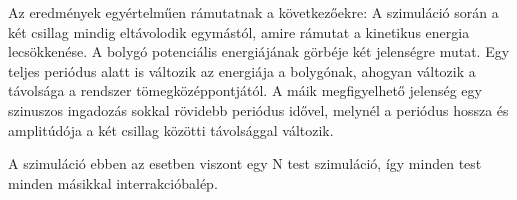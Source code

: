 Az eredmények egyértelműen rámutatnak a következőekre: A szimuláció során a két csillag mindig eltávolodik egymástól, amire rámutat a kinetikus energia lecsökkenése. A bolygó potenciális energiájának görbéje két jelenségre mutat. Egy teljes periódus alatt is változik az energiája a bolygónak, ahogyan változik a távolsága a rendszer tömegközéppontjától. A máik megfigyelhető jelenség egy szinuszos ingadozás sokkal rövidebb periódus idővel, melynél a periódus hossza és amplitúdója a két csillag közötti távolsággal változik. 

A szimuláció ebben az esetben viszont egy N test szimuláció, így minden test minden másikkal interrakcióbalép.